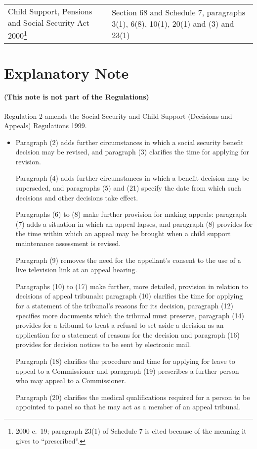 \documentclass[12pt,a4paper]{article}
\begin{document}
{\begin{longtable}{p{94.09729pt}p{271.91016pt}}
Child Support, Pensions and Social Security Act 2000\footnote{2000 c.\ 19; paragraph 23(1) of Schedule 7 is cited because of the meaning it gives to “prescribed”.}	&Section 68 and Schedule 7, paragraphs 3(1), 6(8), 10(1), 20(1) and (3) and 23(1)\\
\end{longtable}

}

\part{Explanatory Note}

\renewcommand\parthead{— Explanatory Note}

\subsection*{(This note is not part of the Regulations)}

Regulation 2 amends the Social Security and Child Support (Decisions and Appeals) Regulations 1999.
\begin{itemize}\item[]
    Paragraph (2) adds further circumstances in which a social security benefit decision may be revised, and paragraph (3) clarifies the time for applying for revision.

    Paragraph (4) adds further circumstances in which a benefit decision may be superseded, and paragraphs (5) and (21) specify the date from which such decisions and other decisions take effect.

    Paragraphs (6) to (8) make further provision for making appeals: paragraph (7) adds a situation in which an appeal lapses, and paragraph (8) provides for the time within which an appeal may be brought when a child support maintenance assessment is revised.

    Paragraph (9) removes the need for the appellant’s consent to the use of a live television link at an appeal hearing.

    Paragraphs (10) to (17) make further, more detailed, provision in relation to decisions of appeal tribunals: paragraph (10) clarifies the time for applying for a statement of the tribunal’s reasons for its decision, paragraph (12) specifies more documents which the tribunal must preserve, paragraph (14) provides for a tribunal to treat a refusal to set aside a decision as an application for a statement of reasons for the decision and paragraph (16) provides for decision notices to be sent by electronic mail.

    Paragraph (18) clarifies the procedure and time for applying for leave to appeal to a Commissioner and paragraph (19) prescribes a further person who may appeal to a Commissioner.

    Paragraph (20) clarifies the medical qualifications required for a person to be appointed to panel so that he may act as a member of an appeal tribunal. 
\end{itemize}
\end{document}
